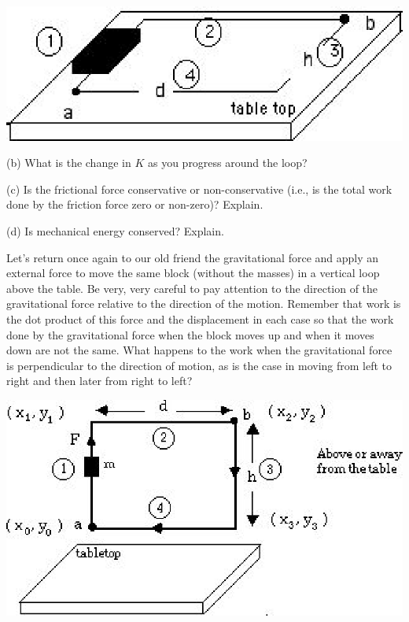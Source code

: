 \vspace{0.3cm}
{\par\raggedright \includegraphics{conservative_fig3.eps} \par}
\vspace{0.3cm}

\vspace{10mm}
(b) What is the change in $K$ as you progress around the loop?
\vspace{10mm}

(c) Is the frictional force conservative or non-conservative (i.e., 
is the total
work done by the friction force zero or non-zero)? Explain.
\vspace{20mm}

(d) Is mechanical energy conserved? Explain. 
\vspace{20mm}

Let's return once again to our old friend the gravitational force and apply
an external force to move the same block (without the masses) in a vertical
loop above the table. Be very, very careful to pay attention to the direction
of the gravitational force relative to the direction of the motion. Remember
that work is the dot product of this force and the displacement in each case
so that the work done by the gravitational force when the block moves up and
when it moves down are not the same. What happens to the work when the gravitational
force is perpendicular to the direction of motion, as is the case in moving
from left to right and then later from right to left?

\vspace{0.3cm}
{\par\centering \includegraphics{conservative_fig4.eps} \par}
\vspace{0.3cm}

